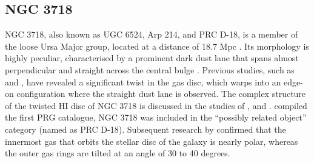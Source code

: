 \documentclass{pas}
\begin{document}
\begin{table}[hbt!]
    \centering
    \caption{UVIT observation details}
\end{table}
\subsection{NGC 3718}
NGC 3718, also known as UGC 6524, Arp 214, and PRC D-18, is a member of the loose Ursa Major group, located at a distance of 18.7 Mpc \citep{1988Tully,1996Tully}. Its morphology is highly peculiar, characterised by a prominent dark dust lane that spans almost perpendicular and straight across the central bulge \citep{2005Krips}. Previous studies, such as \cite{1979Allsopp} and \cite{1985Schwarz},  have revealed a significant twist in the gas disc, which warps into an edge-on configuration where the straight dust lane is observed. The complex structure of the twisted HI disc of NGC 3718 is discussed in the studies of \cite{2004Pott}, \cite{2005Krips} and \cite{2009Sparke}. \cite{whitmore1990} compiled the first PRG catalogue, NGC 3718 was included in the “possibly related object” category (named as PRC D-18). Subsequent research by \cite{2009Sparke} confirmed that the innermost gas that orbits the stellar disc of the galaxy is nearly polar, whereas the outer gas rings are tilted at an angle of 30 to 40 degrees. 
\end{document}
